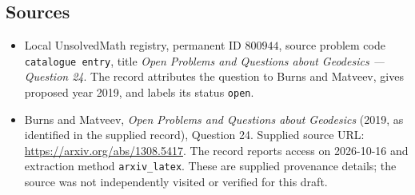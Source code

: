 \documentclass[11pt]{article}
\begin{document}
\subsection{Sources}
\begin{itemize}
\item Local UnsolvedMath registry, permanent ID \(800944\), source problem code \texttt{catalogue entry}, title \emph{Open Problems and Questions about Geodesics --- Question 24}. The record attributes the question to Burns and Matveev, gives proposed year 2019, and labels its status \texttt{open}.
\item Burns and Matveev, \emph{Open Problems and Questions about Geodesics} (2019, as identified in the supplied record), Question 24. Supplied source URL: \url{https://arxiv.org/abs/1308.5417}. The record reports access on 2026-10-16 and extraction method \texttt{arxiv\_latex}. These are supplied provenance details; the source was not independently visited or verified for this draft.
\end{itemize}
\end{document}
